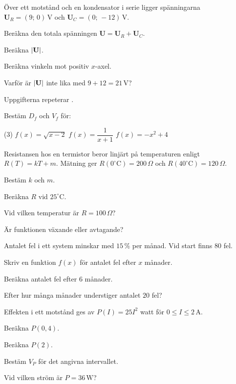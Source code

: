 Över ett motstånd och en kondensator i serie ligger spänningarna
$\mathbf{U}_R = (9;\,0)\,\text{V}$ och $\mathbf{U}_C = (0;\,-12)\,\text{V}$.
\begin{parts}
  \item Beräkna den totala spänningen $\mathbf{U} = \mathbf{U}_R + \mathbf{U}_C$.
  \item Beräkna $\lvert\mathbf{U}\rvert$.
  \item Beräkna vinkeln mot positiv $x$-axel.
  \item Varför är $\lvert\mathbf{U}\rvert$ inte lika med $9 + 12 = 21\,\text{V}$?
\end{parts}

Uppgifterna repeterar .

Bestäm $D_f$ och $V_f$ för:
\begin{delar}(3)
  \task $f(x) = \sqrt{x - 2}$
  \task $f(x) = \dfrac{1}{x + 1}$
  \task $f(x) = -x^2 + 4$
\end{delar}

Resistansen hos en termistor beror linjärt på temperaturen enligt $R(T) = kT + m$. Mätning ger
$R(0^{\circ}\text{C}) = 200\,\Omega$ och $R(40^{\circ}\text{C}) = 120\,\Omega$.
\begin{parts}
  \item Bestäm $k$ och $m$.
  \item Beräkna $R$ vid $25^{\circ}\text{C}$.
  \item Vid vilken temperatur är $R = 100\,\Omega$?
  \item Är funktionen växande eller avtagande?
\end{parts}

Antalet fel i ett system minskar med $15\,\%$ per månad. Vid start finns $80$ fel.
\begin{parts}
  \item Skriv en funktion $f(x)$ för antalet fel efter $x$ månader.
  \item Beräkna antalet fel efter $6$ månader.
  \item Efter hur många månader understiger antalet $20$ fel?
\end{parts}

Effekten i ett motstånd ges av $P(I) = 25I^2$ watt för $0 \leq I \leq 2\,\text{A}$.
\begin{parts}
  \item Beräkna $P(0{,}4)$.
  \item Beräkna $P(2)$.
  \item Bestäm $V_P$ för det angivna intervallet.
  \item Vid vilken ström är $P = 36\,\text{W}$?
\end{parts}

